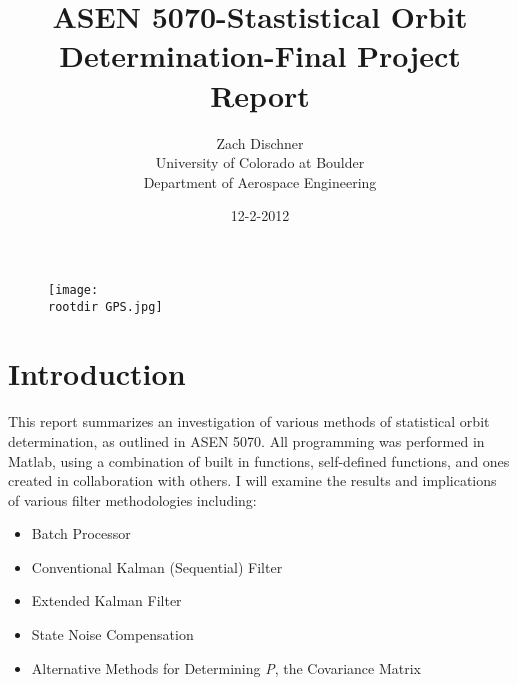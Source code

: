\documentclass[11pt,a4paper,oneside]{article}
\newcommand{\rootdir}{./Figures/}
\begin{document}
\title{ASEN 5070-Stastistical Orbit Determination-Final Project Report}
\author{Zach Dischner \\ University of Colorado at Boulder \\ Department of Aerospace Engineering}
\date{12-2-2012}
\maketitle

\begin{center}
	\begin{figure}[H]
		\texttt{[image: \\rootdir GPS.jpg]}    \cite{GPS}
	\end{figure}
\end{center}


\newpage
\section{Introduction}
This report summarizes an investigation of various methods of statistical orbit determination, as outlined in ASEN 5070. All programming was performed in Matlab, using a combination of built in functions,  self-defined functions, and ones created in collaboration with others. I will examine the results and implications of various filter methodologies including:

\begin{itemize}
	\renewcommand{\labelitemi}{$\bullet$}
	\item Batch Processor
	\item Conventional Kalman (Sequential) Filter
	\item Extended Kalman Filter
	\item State Noise Compensation
	\item Alternative Methods for Determining \emph{P}, the Covariance Matrix
\end{itemize}


\newpage
\tableofcontents{}
\listoffigures{}
\end{document}
